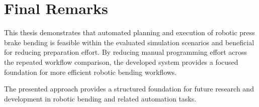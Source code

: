 \section{Final Remarks}
\label{sec:final-remarks}

This thesis demonstrates that automated planning and execution of robotic press brake bending is feasible within the evaluated simulation scenarios and beneficial for reducing preparation effort. By reducing manual programming effort across the repeated workflow comparison, the developed system provides a focused foundation for more efficient robotic bending workflows.

The presented approach provides a structured foundation for future research and development in robotic bending and related automation tasks.


